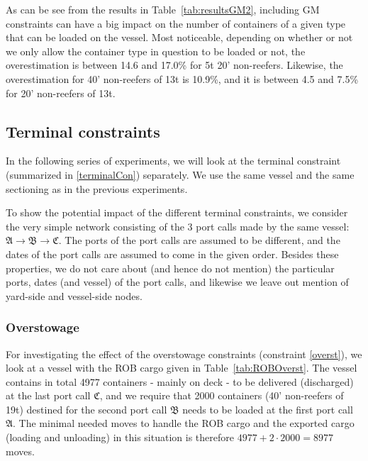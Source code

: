 
As can be see from the results in Table~\ref{tab:resultsGM2}, including GM constraints can have a big impact on the number of containers of a given type that can be loaded on the vessel. Most noticeable, depending on whether or not we only allow the container type in question to be loaded or not, %
the overestimation is between 14.6 and 17.0\% for 5t 20' non-reefers. Likewise, the overestimation for 40' non-reefers of 13t is %
10.9\%, and it is between 4.5 and 7.5\% for 20' non-reefers of 13t. %

\subsection{Terminal constraints} %
In the following series of experiments, we will look at the terminal constraint (summarized in \eqref{terminalCon}) separately. We use the same vessel and the same sectioning as in the previous experiments.  

To show the potential impact of the different terminal constraints, we consider the very simple network consisting of the 3 port calls made by the same vessel: $\mathfrak{A} \rightarrow \mathfrak{B} \rightarrow \mathfrak{C}$. The ports of the port calls are assumed to be different, and the dates of the port calls are assumed to come in the given order. Besides these properties, we do not care about (and hence do not mention) the particular ports, dates (and vessel) of the port calls, and likewise we leave out mention of yard-side and vessel-side nodes. 

\subsubsection{Overstowage}
For investigating the effect of the overstowage constraints (constraint \eqref{overst}), we look at a vessel with the ROB cargo given in Table~\ref{tab:ROBOverst}. The vessel contains in total 4977 containers - mainly on deck - to be delivered (discharged) at the last port call $\mathfrak{C}$, and we require that 2000 containers (40' non-reefers of 19t) destined for the second port call $\mathfrak{B}$ needs to be loaded at the first port call $\mathfrak{A}$. The minimal needed moves to handle the ROB cargo and the exported cargo (loading and unloading) in this situation is therefore $4977 + 2\cdot 2000 = 8977$ moves.%

